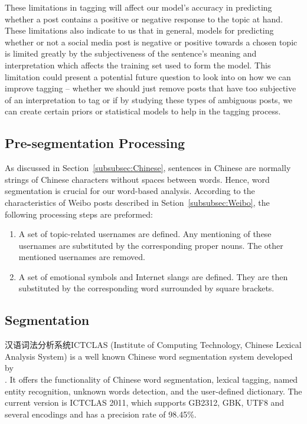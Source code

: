 \documentclass[11pt]{article}
\newcommand{\1}[1]{{\mathbf 1}\left\{#1\right\}}        %
\begin{document}
These limitations in tagging will affect our model's accuracy in predicting whether a post contains a positive or negative response to the topic at hand.  These limitations also indicate to us that in general, models for predicting whether or not a social media post is negative or positive towards a chosen topic is limited greatly by the subjectiveness of the sentence's meaning and interpretation which affects the training set used to form the model. This limitation could present a potential future question to look into on how we can improve tagging -- whether we should just remove posts that have too subjective of an interpretation to tag or if by studying these types of ambiguous posts, we can create certain priors or statistical models to help in the tagging process. 



\subsection{Pre-segmentation Processing}

As discussed in Section~\ref{subsubsec:Chinese}, sentences in Chinese are normally strings of Chinese characters without spaces between words. Hence, word segmentation is crucial for our word-based analysis. According to the characteristics of Weibo posts described in Setion~\ref{subsubsec:Weibo}, the following processing steps are preformed:
\begin{enumerate}
\item A set of topic-related usernames are defined.  Any mentioning of these usernames are substituted by the corresponding proper nouns. The other mentioned usernames are removed.
\item A set of emotional symbols and Internet slangs are defined.  They are then substituted by the corresponding word surrounded by square brackets.
\end{enumerate}

	

\subsection{Segmentation}

汉语词法分析系统ICTCLAS (Institute of Computing Technology, Chinese Lexical Analysis System) is a well known Chinese word segmentation system developed by 
\\ \cite{ICTCLAS}. It offers the functionality of  Chinese word segmentation, lexical tagging, named entity recognition, unknown words detection, and the user-defined dictionary. 
The current version is ICTCLAS 2011, which supports GB2312, GBK, UTF8 and several encodings and has a precision rate of 98.45\%. 
\end{document}
